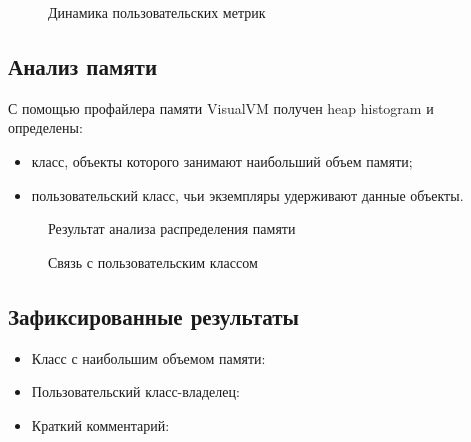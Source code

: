 \documentclass[12pt,a4paper]{article}
\begin{document}
\begin{figure}[h]
\centering
{}
\caption{Динамика пользовательских метрик}
\end{figure}

\subsection{Анализ памяти}
С помощью профайлера памяти VisualVM получен heap histogram и определены:
\begin{itemize}
    \item класс, объекты которого занимают наибольший объем памяти;
    \item пользовательский класс, чьи экземпляры удерживают данные объекты.
\end{itemize}

\begin{figure}[h]
\centering
{}
\caption{Результат анализа распределения памяти}
\end{figure}

\begin{figure}[h]
\centering
{}
\caption{Связь с пользовательским классом}
\end{figure}

\subsection{Зафиксированные результаты}
\begin{itemize}
    \item Класс с наибольшим объемом памяти: \underline{\hspace{7cm}}
    \item Пользовательский класс-владелец: \underline{\hspace{7cm}}
    \item Краткий комментарий: \underline{\hspace{7cm}}
\end{itemize}
\end{document}
